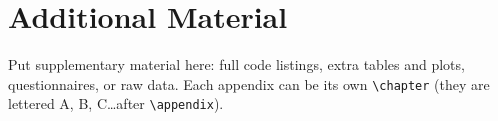 \chapter{Additional Material}
\label{app:extra}

Put supplementary material here: full code listings, extra tables and plots,
questionnaires, or raw data. Each appendix can be its own \verb|\chapter| (they
are lettered A, B, C\ldots after \verb|\appendix|).
